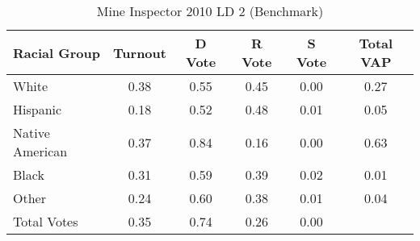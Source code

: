 \begin{table}[htb]
\begin{center}
\caption{Mine Inspector 2010 LD 2 (Benchmark)}
\label{smine_vap_ld_2_benchmark}
\begin{tabular}{lccccc}
  \hline
Racial Group & Turnout & D Vote & R Vote & S Vote & Total VAP \\ 
  \hline
White & 0.38 & 0.55 & 0.45 & 0.00 & 0.27 \\ 
  Hispanic & 0.18 & 0.52 & 0.48 & 0.01 & 0.05 \\ 
  Native American & 0.37 & 0.84 & 0.16 & 0.00 & 0.63 \\ 
  Black & 0.31 & 0.59 & 0.39 & 0.02 & 0.01 \\ 
  Other & 0.24 & 0.60 & 0.38 & 0.01 & 0.04 \\ 
  Total Votes & 0.35 & 0.74 & 0.26 & 0.00 &  \\ 
   \hline
\end{tabular}
\end{center}
\end{table}
